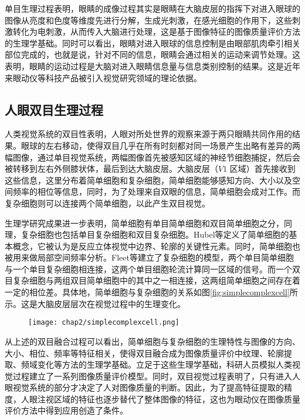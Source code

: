 单目生理过程表明，眼睛的成像过程其实是眼睛在大脑皮层的指挥下对进入眼球的图像从亮度和色度等维度先进行分解，生成光刺激，在感光细胞的作用下，这些刺激转化为电刺激，从而传入大脑进行处理，这是基于图像特征的图像质量评价方法的生理学基础。同时可以看出，眼睛对进入眼球的信息控制是由眼部肌肉牵引相关部位完成的，也就是说，针对不同的信息，眼睛会通过相关的运动来调节处理。这表明，眼睛的运动过程是大脑对进入眼睛信息量与信息类别控制的结果。这是近年来眼动仪等科技产品被引入视觉研究领域的理论依据。
\subsection{人眼双目生理过程}
\label{sec:doubleye}

人类视觉系统的双目性表明，人眼对所处世界的观察来源于两只眼睛共同作用的结果。眼球的左右移动，使得双目几乎在所有时刻都对同一场景产生出略有差异的两幅图像，通过单目视觉系统，两幅图像首先被感知区域的神经节细胞捕捉，然后会被转移到左右外侧膝状体，最后到达大脑皮层。大脑皮层（$V1$ 区域）首先接收到这些信息，这里分布着简单细胞和复杂细胞，简单细胞能够感知方向、大小以及空间频率的相位等信息，同时，为了处理来自双眼的信息，简单细胞会成对工作。而复杂细胞则可以连接两个简单细胞，以此产生双目视觉\parencite{bensalma2013perceptual}。

生理学研究成果进一步表明，简单细胞有单目简单细胞和双目简单细胞之分，同理，复杂细胞也包括单目复杂细胞和双目复杂细胞。Hubel等\parencite{hubel1962receptive}定义了简单细胞的基本概念，它被认为是反应立体视觉中边界、轮廓的关键性元素。同时，简单细胞也被用来做局部空间频率分析。Fleet等\parencite{fleet1996neural}建立了复杂细胞的模型，两个单目简单细胞与一个单目复杂细胞相连接，这两个单目细胞轮流计算同一区域的信号。而一个双目复杂细胞与两组双目简单细胞中的其中之一相连接，这两组简单细胞之间存在着一定的相位差。具体地，简单细胞与复杂细胞的关系如图\ref{fig:simplecomplexcell}所示。这是大脑皮层层次在视觉过程中的生理变化。
\begin{figure}[!htp]
  \centering
  \texttt{[image: chap2/simplecomplexcell.png]}
\end{figure}

从上述的双目融合过程可以看出，简单细胞与复杂细胞的生理特性与图像的方向、大小、相位、频率等特征相关，使得双目融合成为图像质量评价中纹理、轮廓提取、频域变化等方法的生理学基础。立足于这些生理学基础，科研人员模拟人类视觉过程建立了一系列图像质量评价模型\parencite{bensalma2013perceptual,engelke2011visual,hachicha2013stereo,ryu2014no}。同时，双目视觉过程表明了，只有进入人眼视觉系统的部分才决定了人对图像质量的判断。因此，为了提高特征提取的精度，人眼注视区域的特征也逐步替代了整体图像的特征，这也为眼动仪在图像质量评价方法中得到应用创造了条件。
